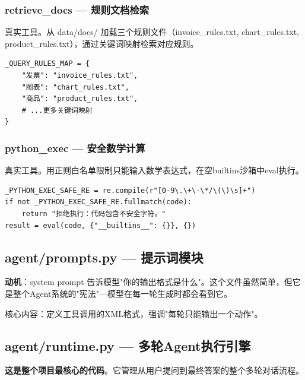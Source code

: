 \documentclass[fontset=none,11pt,a4paper]{ctexart}
\begin{document}
\subsubsection{retrieve\_docs --- 规则文档检索}

真实工具。从 data/docs/ 加载三个规则文件（invoice\_rules.txt, chart\_rules.txt, product\_rules.txt），通过关键词映射检索对应规则。

\begin{lstlisting}
_QUERY_RULES_MAP = {
    "发票": "invoice_rules.txt",
    "图表": "chart_rules.txt",
    "商品": "product_rules.txt",
    # ...更多关键词映射
}
\end{lstlisting}

\subsubsection{python\_exec --- 安全数学计算}

真实工具。用正则白名单限制只能输入数学表达式，在空builtins沙箱中eval执行。

\begin{lstlisting}
_PYTHON_EXEC_SAFE_RE = re.compile(r"[0-9\.\+\-\*/\(\)\s]+")
if not _PYTHON_EXEC_SAFE_RE.fullmatch(code):
    return "拒绝执行：代码包含不安全字符。"
result = eval(code, {"__builtins__": {}}, {})
\end{lstlisting}

\subsection{agent/prompts.py --- 提示词模块}

\textbf{动机}：system prompt 告诉模型"你的输出格式是什么"。这个文件虽然简单，但它是整个Agent系统的"宪法"---模型在每一轮生成时都会看到它。

核心内容：定义工具调用的XML格式，强调"每轮只能输出一个动作"。

\subsection{agent/runtime.py --- 多轮Agent执行引擎}

\textbf{这是整个项目最核心的代码}。它管理从用户提问到最终答案的整个多轮对话流程。
\end{document}
